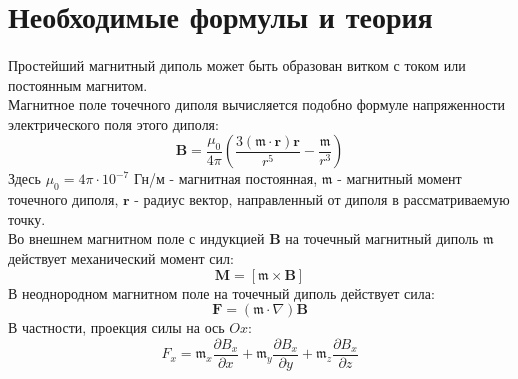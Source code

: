 \documentclass[a4paper, 12pt]{article}
\begin{document}
\section*{Необходимые формулы и теория}
\paragraph{}
Простейший магнитный диполь может быть образован витком с током или постоянным магнитом.\\
Магнитное поле точечного диполя вычисляется подобно формуле напряженности электрического поля этого диполя:
\begin{equation}
    \mathbf{B} = \frac{\mu_{0}}{4 \pi}\left(\frac{3({\mathfrak{m}} \cdot \mathbf{r}) \mathbf{r}}{r^{5}} - \frac{{\mathfrak{m}}}{r^{3}}\right)
    \label{Магнитное поле диполя}
\end{equation}
Здесь $\mu_{0} = 4\pi \cdot 10^{-7}$ Гн/м - магнитная постоянная, $\mathbf{\mathfrak{m}}$ - магнитный момент точечного диполя, $\mathbf{r}$ - радиус вектор, направленный от диполя в рассматриваемую точку.\\
Во внешнем магнитном поле с индукцией $\mathbf{B}$ на точечный магнитный диполь $\mathfrak{m}$ действует механический момент сил:
\begin{equation}
    \mathbf{M} = [\mathfrak{m} \times \mathbf{B}]
    \label{Момент}
\end{equation}
В неоднородном магнитном поле на точечный диполь действует сила:
\begin{equation}
    \mathbf{F} = (\mathfrak{m} \cdot \nabla)\mathbf{B}
    \label{Сила действия на диполь}
\end{equation}
В частности, проекция силы на ось $\mathit{Ox}$:
\begin{equation}
    F_{x} = \mathfrak{m}_{x}\frac{\partial B_{x}}{\partial x} + \mathfrak{m}_{y}\frac{\partial B_{x}}{\partial y} + \mathfrak{m}_{z}\frac{\partial B_{x}}{\partial z}
    \label{Проекция силы}
\end{equation}
\end{document}
